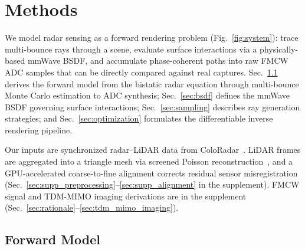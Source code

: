 \section{Methods}
\label{sec:methods}

We model radar sensing as a forward rendering problem (Fig.~\ref{fig:system}): trace multi-bounce rays through a scene, evaluate surface interactions via a physically-based mmWave BSDF, and accumulate phase-coherent paths into raw FMCW ADC samples that can be directly compared against real captures. Sec.~\ref{sec:forward_model} derives the forward model from the bistatic radar equation through multi-bounce Monte Carlo estimation to ADC synthesis; Sec.~\ref{sec:bsdf} defines the mmWave BSDF governing surface interactions; Sec.~\ref{sec:sampling} describes ray generation strategies; and Sec.~\ref{sec:optimization} formulates the differentiable inverse rendering pipeline.

Our inputs are synchronized radar--LiDAR data from ColoRadar~\cite{kramer2022coloradar}. LiDAR frames are aggregated into a triangle mesh via screened Poisson reconstruction~\cite{kazhdan2006poisson}, and a GPU-accelerated coarse-to-fine alignment corrects residual sensor misregistration (Sec.~\ref{sec:supp_preprocessing}--\ref{sec:supp_alignment} in the supplement). FMCW signal and TDM-MIMO imaging derivations are in the supplement (Sec.~\ref{sec:rationale}--\ref{sec:tdm_mimo_imaging}).

\subsection{Forward Model}
\label{sec:forward_model}

